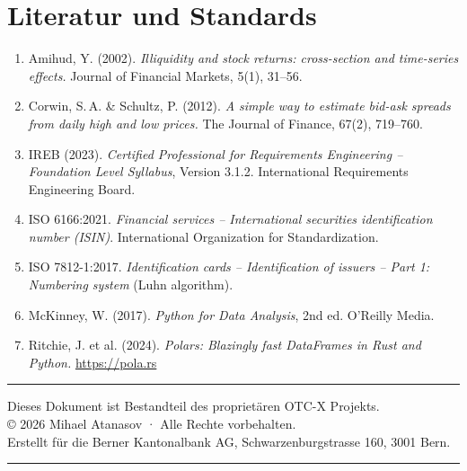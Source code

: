 \documentclass[12pt, a4paper, oneside]{report}
\begin{document}
\section{Literatur und Standards}

\begin{enumerate}
  \item Amihud, Y. (2002). \textit{Illiquidity and stock returns: cross-section and time-series effects.} Journal of Financial Markets, 5(1), 31--56.
  \item Corwin, S.\,A. \& Schultz, P. (2012). \textit{A simple way to estimate bid-ask spreads from daily high and low prices.} The Journal of Finance, 67(2), 719--760.
  \item IREB (2023). \textit{Certified Professional for Requirements Engineering -- Foundation Level Syllabus}, Version 3.1.2. International Requirements Engineering Board.
  \item ISO 6166:2021. \textit{Financial services -- International securities identification number (ISIN)}. International Organization for Standardization.
  \item ISO 7812-1:2017. \textit{Identification cards -- Identification of issuers -- Part 1: Numbering system} (Luhn algorithm).
  \item McKinney, W. (2017). \textit{Python for Data Analysis}, 2nd ed. O'Reilly Media.
  \item Ritchie, J. et al. (2024). \textit{Polars: Blazingly fast DataFrames in Rust and Python.} \url{https://pola.rs}
\end{enumerate}

\vfill

\begin{center}
{\color{swissred}\rule{0.4\textwidth}{1pt}}

\vspace{0.5cm}
{\small\sffamily\textcolor{darknavy}{Dieses Dokument ist Bestandteil des proprietären OTC-X Projekts.}}\\
{\small\sffamily\textcolor{darknavy}{© 2026 Mihael Atanasov · Alle Rechte vorbehalten.}}\\
{\small\sffamily\textcolor{darknavy}{Erstellt für die Berner Kantonalbank AG, Schwarzenburgstrasse 160, 3001 Bern.}}

\vspace{0.5cm}
{\color{swissred}\rule{0.4\textwidth}{1pt}}
\end{center}
\end{document}
